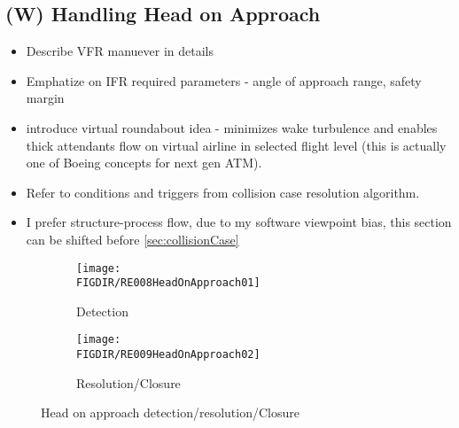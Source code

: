 \subsection{(W) Handling Head on Approach}\label{sec:handlingHeadOnApproach}
    \begin{itemize}
        \item Describe VFR manuever in details
        \item Emphatize on IFR required parameters - angle of approach range, safety margin
        \item introduce virtual roundabout idea - minimizes wake turbulence and enables thick attendants flow on virtual airline in selected flight level (this is actually one of Boeing concepts for next gen ATM).
        \item Refer to conditions and triggers from collision case resolution algorithm.
        \item I prefer structure-process flow, due to my software viewpoint bias, this section can be shifted before \ref{sec:collisionCase}
    \end{itemize}
    \begin{figure}[H]
    	\centering
        \begin{subfigure}{0.45\textwidth}
        	\centering
            \texttt{[image: \\FIGDIR/RE008HeadOnApproach01]} 
            \caption{Detection}
            \label{fig:HeadOnApproachTheoreticalDetection}
        \end{subfigure}
        \begin{subfigure}{0.45\textwidth}
        	\centering
            \texttt{[image: \\FIGDIR/RE009HeadOnApproach02]} 
            \caption{Resolution/Closure}
            \label{fig:HeadOnApproachTheoreticalResolution}
        \end{subfigure}
        \caption{Head on approach detection/resolution/Closure}
        \label{fig:HeadOnApproachTheoretical}
    \end{figure}
    
